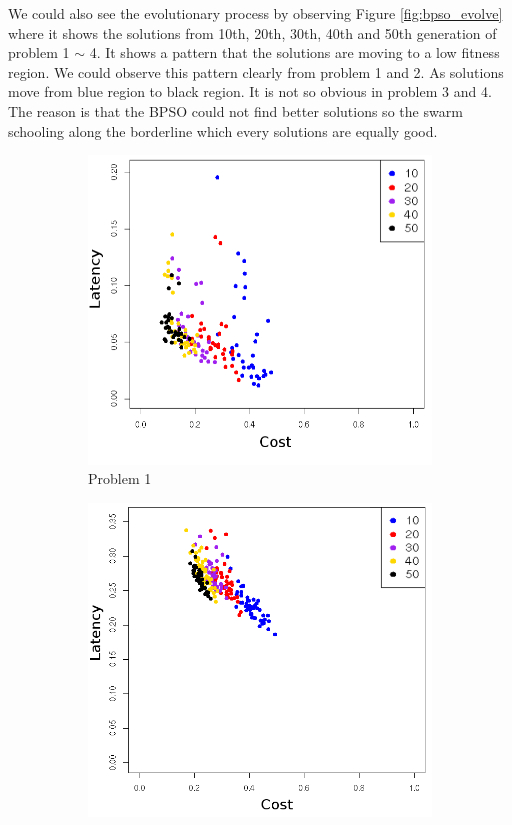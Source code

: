 We could also see the  evolutionary process by observing Figure \ref{fig:bpso_evolve} where it shows
the solutions from 10th, 20th, 30th, 40th and 50th generation of problem 1 $\sim$ 4. It shows a 
pattern that the solutions are moving to a low fitness region. We could observe this pattern clearly from problem 1 and 2. As solutions move from blue region to black region. It is not so obvious in problem 3 
and 4. The reason is that the BPSO could not find better solutions so the swarm schooling along the borderline which every solutions are equally good.
\begin{figure}[!h]
   \centering
   \begin{subfigure}{0.4\textwidth}
       \includegraphics[width=\textwidth]{pics/binaryevolve1.png}
	   \caption{Problem 1}
   \end{subfigure}
   \begin{subfigure}{0.4\textwidth}
       \includegraphics[width=\textwidth]{pics/binaryevolve2.png}

\end{subfigure}
\end{figure}
